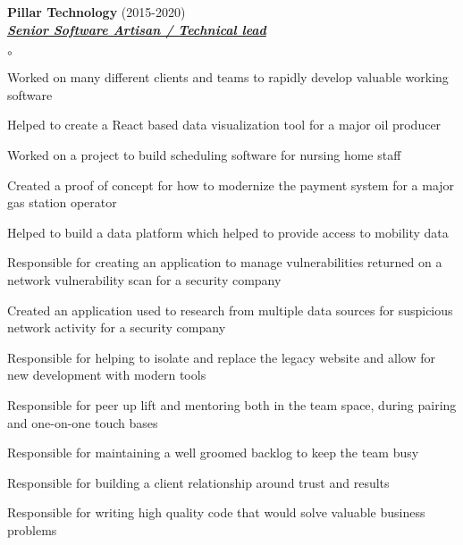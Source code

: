 \documentclass{article}
\newcommand{\employer}[3]{{ \textbf{#1} (#2)\\ \underline{\textbf{\emph{#3}}}\\  }}
\newenvironment{achievements}{\begin{list}{$\circ$}{\topsep 0pt \itemsep -2pt}}{\vspace*{4pt}\end{list}}
\begin{document}
\employer{Pillar Technology}{2015-2020}{Senior Software Artisan / Technical lead}
	\begin{achievements}
	\item Worked on many different clients and teams to rapidly develop valuable working software
	\item Helped to create a React based data visualization tool for a major oil producer
	\item Worked on a project to build scheduling software for nursing home staff
	\item Created a proof of concept for how to modernize the payment system for a major gas station operator
	\item Helped to build a data platform which helped to provide access to mobility data
	\item Responsible for creating an application to manage vulnerabilities returned on a network vulnerability scan for a security company
	\item Created an application used to research from multiple data sources for suspicious network activity for a security company
	\item Responsible for helping to isolate and replace the legacy website and allow for new development with modern tools
	\item Responsible for peer up lift and mentoring both in the team space, during pairing and one-on-one touch bases
	\item Responsible for maintaining a well groomed backlog to keep the team busy
	\item Responsible for building a client relationship around trust and results
	\item Responsible for writing high quality code that would solve valuable business problems
	\end{achievements}
\end{document}
